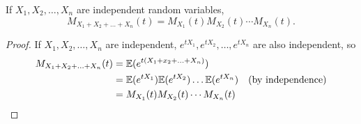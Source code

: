 \begin{corollary}\label{cor:mgfs_for_sums}
If $X_1,X_2,\ldots,X_n$ are independent random variables, 
\[
M_{X_1+X_2+\ldots+X_n}(t) = M_{X_1}(t)M_{X_2}(t)\cdots M_{X_n}(t).
\]
\begin{proof}
If $X_1,X_2,\ldots,X_n$ are independent, $e^{tX_1},e^{tX_2},\ldots,e^{tX_n}$ are also independent, so
\begin{align*}
M_{X_1+X_2+\ldots+X_n}(t)
	& = \mathbb{E}(e^{t(X_1+x_2+\ldots+X_n)}) \\
	& = \mathbb{E}(e^{tX_1})\mathbb{E}(e^{tX_2})\ldots\mathbb{E}(e^{tX_n}) \quad\text{(by independence)}\\
	& = M_{X_1}(t)M_{X_2}(t)\cdots M_{X_n}(t)
\end{align*}	
\end{proof}
\end{corollary}

%
%
%

